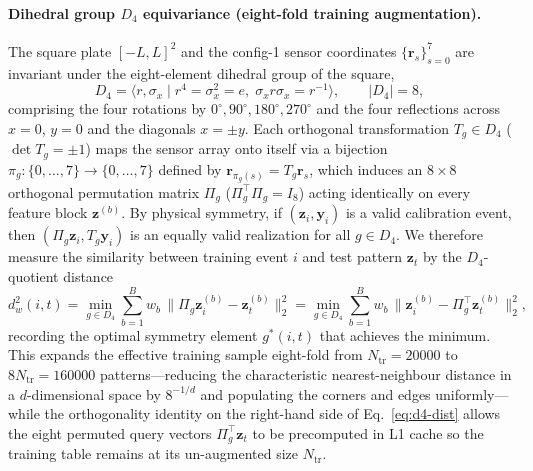 \documentclass[11pt,a4paper]{article}
\begin{document}
\paragraph{Dihedral group $D_4$ equivariance (eight-fold training augmentation).}
The square plate $[-L,L]^2$ and the config-1 sensor coordinates
$\{\mathbf{r}_s\}_{s=0}^{7}$ are invariant under the eight-element
dihedral group of the square,
\begin{equation}
  D_4 = \bigl\langle r, \sigma_x \;\big|\; r^4 = \sigma_x^2 = e,\;
        \sigma_x r \sigma_x = r^{-1} \bigr\rangle,
  \qquad |D_4| = 8,
\end{equation}
comprising the four rotations by $0^\circ, 90^\circ, 180^\circ, 270^\circ$
and the four reflections across $x=0$, $y=0$ and the diagonals $x=\pm y$.
Each orthogonal transformation $T_g \in D_4$ ($\det T_g = \pm 1$) maps
the sensor array onto itself via a bijection $\pi_g: \{0,\dots,7\}\to\{0,\dots,7\}$
defined by $\mathbf{r}_{\pi_g(s)} = T_g \mathbf{r}_s$, which induces an
$8\times 8$ orthogonal permutation matrix $\Pi_g$ ($\Pi_g^{\top}\Pi_g = I_8$)
acting identically on every feature block $\mathbf{z}^{(b)}$.
By physical symmetry, if $(\mathbf{z}_i, \mathbf{y}_i)$ is a valid
calibration event, then $(\Pi_g\mathbf{z}_i, T_g\mathbf{y}_i)$ is an
equally valid realization for all $g \in D_4$.  We therefore measure
the similarity between training event $i$ and test pattern $\mathbf{z}_t$
by the $D_4$-quotient distance
\begin{equation}
  d_w^2(i, t)
  = \min_{g \in D_4} \sum_{b=1}^{B} w_b\,\bigl\|\Pi_g \mathbf{z}^{(b)}_i - \mathbf{z}^{(b)}_t\bigr\|_2^2
  = \min_{g \in D_4} \sum_{b=1}^{B} w_b\,\bigl\|\mathbf{z}^{(b)}_i - \Pi_g^{\top}\mathbf{z}^{(b)}_t\bigr\|_2^2,
  \label{eq:d4-dist}
\end{equation}
recording the optimal symmetry element $g^*(i,t)$ that achieves the
minimum.  This expands the effective training sample eight-fold from
$N_{\mathrm{tr}} = \num{20000}$ to $8 N_{\mathrm{tr}} = \num{160000}$
patterns---reducing the characteristic nearest-neighbour distance in a
$d$-dimensional space by $8^{-1/d}$ and populating the corners and edges
uniformly---while the orthogonality identity on the right-hand side of
Eq.~\ref{eq:d4-dist} allows the eight permuted query vectors
$\Pi_g^{\top}\mathbf{z}_t$ to be precomputed in L1 cache so the
training table remains at its un-augmented size $N_{\mathrm{tr}}$.
\end{document}
